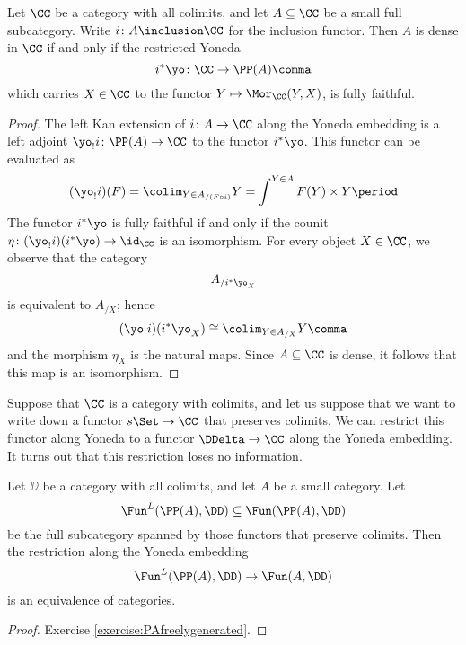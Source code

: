 \begin{proposition}
  Let $\CC$ be a category with all colimits, and let $A \subseteq \CC$ be a small full subcategory.
  Write $i \colon A \inclusion \CC$ for the inclusion functor.
  Then $A$ is dense in $\CC$ if and only if the restricted Yoneda
  \[
    i^{\ast} \yo \colon \CC \to \PP(A) \comma
  \]
  which carries $X \in \CC$ to the functor $Y \mapsto \Mor_{\CC}(Y,X)$, is fully faithful.
\end{proposition}

\begin{proof}
  The left Kan extension of $i \colon A \to \CC$ along the Yoneda embedding is a left adjoint $\yo_!i \colon \PP(A) \to \CC$ to the functor $i^{\ast} \yo$.
  This functor can be evaluated as
  \[
    (\yo_!i)(F) = \colim_{Y \in A_{/(F \circ i)}} Y = \int^{Y \in A} F(Y) \times Y \period
  \]
  The functor $i^{\ast}\yo$ is fully faithful if and only if the counit $\eta \colon (\yo_!i)(i^{\ast}\yo) \to \id_{\CC}$ is an isomorphism.
  For every object $X \in \CC$, we observe that the category
  \[
    A_{/i^{\ast}\yo_X}
  \]
  is equivalent to $A_{/X}$;
  hence
  \[
    (\yo_!i)(i^{\ast}\yo_X) \cong \colim_{Y \in A_{/X}} Y \comma
  \]
  and the morphism $\eta_X$ is the natural maps.
  Since $A \subseteq \CC$ is dense, it follows that this map is an isomorphism.
\end{proof}

Suppose that $\CC$ is a category with colimits, and
let us suppose that we want to write down a functor $s\Set \to \CC$ that preserves colimits.
We can restrict this functor along Yoneda to a functor $\DDelta \to \CC$ along the Yoneda embedding.
It turns out that this restriction loses no information.

\begin{proposition}%
  \label{prp:PAfreelygeneratedbyA}
  Let $\DD$ be a category with all colimits,
  and let $A$ be a small category.
  Let
  \[
    \Fun^L(\PP(A),\DD) \subseteq \Fun(\PP(A),\DD)
  \]
  be the full subcategory spanned by those functors that preserve colimits.
  Then the restriction along the Yoneda embedding
  \[
    \Fun^L(\PP(A),\DD) \to \Fun(A,\DD)
  \]
  is an equivalence of categories.
\end{proposition}

\begin{proof}
  Exercise \ref{exercise:PAfreelygenerated}.
\end{proof}
